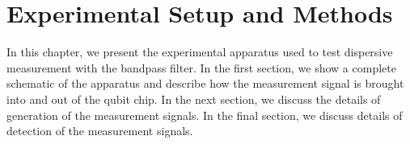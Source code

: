 \chapter{Experimental Setup and Methods} \label{ch:ExperimentalSetup}

In this chapter, we present the experimental apparatus used to test dispersive measurement with the bandpass filter.
In the first section, we show a complete schematic of the apparatus and describe how the measurement signal is brought into and out of the qubit chip.
In the next section, we discuss the details of generation of the measurement signals.
In the final section, we discuss details of detection of the measurement signals.






